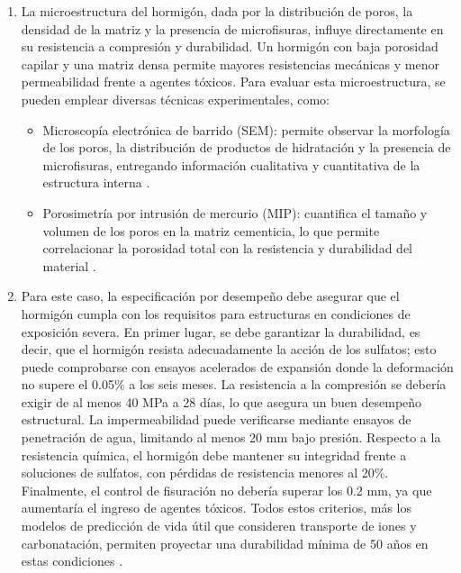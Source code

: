 \begin{enumerate}
    \item La microestructura del hormigón, dada por la distribución de poros, la densidad de la matriz y la presencia de microfisuras, influye directamente en su resistencia a compresión y durabilidad. Un hormigón con baja porosidad capilar y una matriz densa permite mayores resistencias mecánicas y menor permeabilidad frente a agentes tóxicos. Para evaluar esta microestructura, se pueden emplear diversas técnicas experimentales, como:  
    \begin{itemize}
        \item Microscopía electrónica de barrido (SEM): permite observar la morfología de los poros, la distribución de productos de hidratación y la presencia de microfisuras, entregando información cualitativa y cuantitativa de la estructura interna \citep{Diamond1999}.  
        \item Porosimetría por intrusión de mercurio (MIP): cuantifica el tamaño y volumen de los poros en la matriz cementicia, lo que permite correlacionar la porosidad total con la resistencia y durabilidad del material \citep{Gallucci2012}.  
    \end{itemize}

    \item Para este caso, la especificación por desempeño debe asegurar que el hormigón cumpla con los requisitos para estructuras en condiciones de exposición severa. En primer lugar, se debe garantizar la durabilidad, es decir, que el hormigón resista adecuadamente la acción de los sulfatos; esto puede comprobarse con ensayos acelerados de expansión donde la deformación no supere el 0.05\% a los seis meses. La resistencia a la compresión se debería exigir de al menos 40 MPa a 28 días, lo que asegura un buen desempeño estructural. La impermeabilidad puede verificarse mediante ensayos de penetración de agua,  limitando al menos 20 mm bajo presión. Respecto a la resistencia química, el hormigón debe mantener su integridad frente a soluciones de sulfatos, con pérdidas de resistencia menores al 20\%. Finalmente, el control de fisuración no debería superar los 0.2 mm, ya que aumentaría el ingreso de agentes tóxicos. Todos estos criterios, más los modelos de predicción de vida útil que consideren transporte de iones y carbonatación, permiten proyectar una durabilidad mínima de 50 años en estas condiciones \citep{NCh170-2016,ConcreteSociety2006}.


\end{enumerate}
